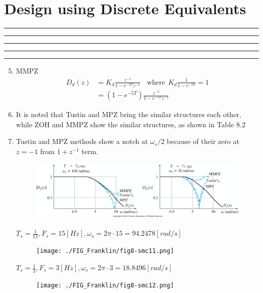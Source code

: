 \setcounter{chapter}{7}
\setcounter{section}{2}
\section{Design using Discrete Equivalents}
\vspace{-8pt} \hrule \hrule \hrule \hrule \hrule  \vspace{12pt}
	\begin{enumerate}
		\setcounter{enumi}{4}
		\item MMPZ
		\begin{align*}
			D_d(z) &= K_d \frac{z^{-1}}{1-e^{-5T}z^{-1}} ~~~~\mbox{where}~~ K_d \frac{1}{1-e^{-5T}} = 1 \\
			&= (1-e^{-5T}) \frac{z^{-1}}{1-e^{-5T}z^{-1}} 
		\end{align*}
		\item It is noted that Tustin and MPZ bring the similar structures each other, while ZOH and MMPZ show the similar structures, as shown in Table 8.2 
		\item Tustin and MPZ methods show a notch at $\omega_s/2$ because of their zero at $z=-1$ from $1+z^{-1}$ term. 
		\begin{figure}[h]
			\centering
			\includegraphics[width=20cm]{./FIG_Franklin/fig8-15.png}
		\end{figure}
		\newpage
		$T_s = \frac{1}{15}, F_s = 15 [Hz], \omega_s = 2 \pi \cdot 15 = 94.2478 [rad/s]$
		\begin{figure}[h]
			\centering
			\texttt{[image: ./FIG\_Franklin/fig8-smc11.png]}
		\end{figure}
		\newpage
		$T_s = \frac{1}{3}, F_s = 3 [Hz], \omega_s = 2 \pi \cdot 3 = 18.8496 [rad/s]$
		\begin{figure}[h]
			\centering
			\texttt{[image: ./FIG\_Franklin/fig8-smc12.png]}
		\end{figure}
	\end{enumerate}		
